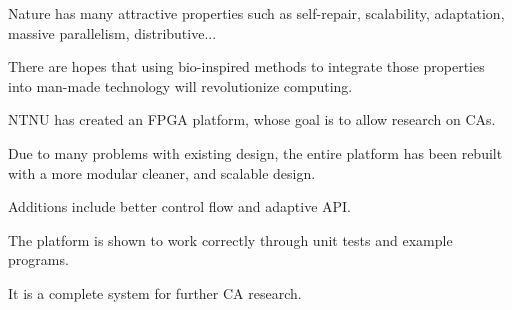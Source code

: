 \TODO

Nature has many attractive properties such as self-repair, scalability, adaptation, massive parallelism, distributive...

There are hopes that using bio-inspired methods to integrate those properties into man-made technology will revolutionize computing.

NTNU has created an FPGA platform, whose goal is to allow research on CAs.

Due to many problems with existing design, the entire platform has been rebuilt with a more modular cleaner, and scalable design.

Additions include better control flow and adaptive API.

The platform is shown to work correctly through unit tests and example programs.

It is a complete system for further CA research.
